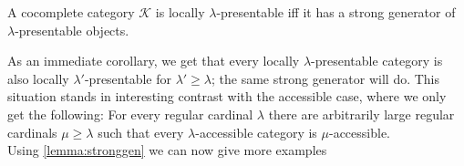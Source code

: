 \begin{Lemma}\label{lemma:stronggen}
A cocomplete category $\mathcal K$ is locally $\lambda$-presentable iff it has a strong generator of $\lambda$-presentable objects. 
\end{Lemma}

As an immediate corollary, we get that every locally $\lambda$-presentable category is also locally $\lambda'$-presentable for $\lambda' \geq \lambda$; the same strong generator will do. This situation stands in interesting contrast with the accessible case, where we only get the following: For every regular cardinal $\lambda$ there are arbitrarily large regular cardinals $\mu \geq \lambda$ such that every $\lambda$-accessible category is $\mu$-accessible. \\

Using \ref{lemma:stronggen} we can now give more examples %

